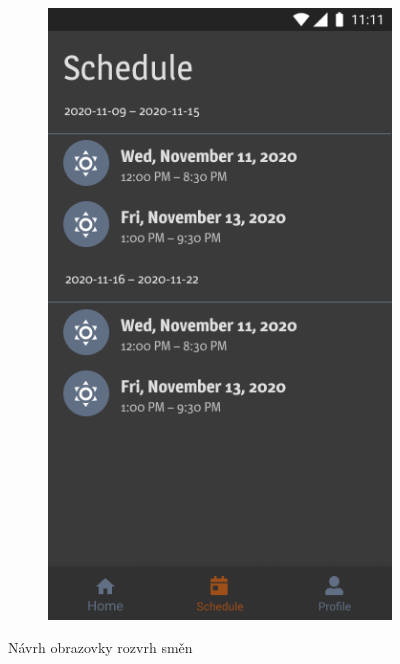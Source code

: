 \documentclass[twoside]{ctuthesis}
\begin{document}
\begin{figure}[h]
\begin{subfigure}[h!]{.5\textwidth}
		\includegraphics[width=.9\linewidth]{img/v1-main-home-schedule-night.png}
		\label{fig:main-schedule-dark}
	\end{subfigure}
	\caption{Návrh obrazovky rozvrh směn}
\end{figure}
\end{document}
